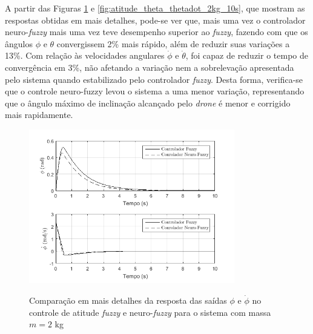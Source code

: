 A partir das Figuras \ref{fig:atitude_phi_phidot_2kg_10s} e \ref{fig:atitude_theta_thetadot_2kg_10s}, que mostram as respostas obtidas em mais detalhes, pode-se ver que, mais uma vez o controlador neuro-\textit{fuzzy} mais uma vez teve desempenho superior ao \textit{fuzzy}, fazendo com que os ângulos $\phi$ e $\theta$ convergissem 2\% mais rápido, além de reduzir suas variações a 13\%. Com relação às velocidades angulares $\dot{\phi}$ e $\dot{\theta}$, foi capaz de reduzir o tempo de convergência em 3\%, não afetando a variação nem a sobrelevação apresentada pelo sistema quando estabilizado pelo controlador \textit{fuzzy}. Desta forma, verifica-se que o controle neuro-fuzzy levou o sistema a uma menor variação, representando que o ângulo máximo de inclinação alcançado pelo \textit{drone} é menor e corrigido mais rapidamente.

\begin{figure}[!htb]
    \centering
    \caption{Comparação em mais detalhes da resposta das saídas $\phi$ e $\dot{\phi}$ no controle de atitude \textit{fuzzy} e neuro-\textit{fuzzy} para o sistema com massa $m=2$ kg}
    \includegraphics[width=0.8\textwidth]{./04-figuras/resultados/novos/atitude_phi_phidot_2kg_10s}
    \label{fig:atitude_phi_phidot_2kg_10s}
\end{figure}

